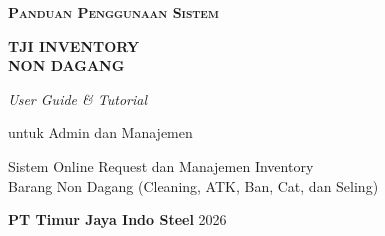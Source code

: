 \documentclass[aspectratio=169,14pt]{beamer}
\begin{document}
{\begin{frame}
\begin{flushleft}
{\color{white!75!Primary}
\fontsize{17}{21}\selectfont
\textbf{\textsc{Panduan Penggunaan Sistem}}
}

\vspace{0.30cm}

{\color{white}
\fontsize{34}{38}\selectfont
\textbf{TJI INVENTORY}\\[2pt]
\fontsize{34}{38}\selectfont
\textbf{NON DAGANG}
}

\vspace{0.55cm}

{\color{white!90}
\fontsize{18}{22}\selectfont
\textit{User Guide \& Tutorial}
}

\vspace{0.15cm}

{\color{white!75}
\fontsize{15}{19}\selectfont
untuk Admin dan Manajemen
}

\vspace{0.85cm}

{\color{white!80}
\fontsize{14}{18}\selectfont
Sistem Online Request dan Manajemen Inventory\\
Barang Non Dagang
(Cleaning, ATK, Ban, Cat, dan Seling)
}

\end{flushleft}

\vfill


\begin{flushleft}

\hspace{0.9cm}

{\color{white}
\fontsize{14}{18}\selectfont
\textbf{PT Timur Jaya Indo Steel}
\hspace{0.3cm}
{\color{white!60}
\textbar
}
\hspace{0.3cm}
2026
}

\end{flushleft}

\vspace{0.65cm}

\end{frame}

}

\end{document}
